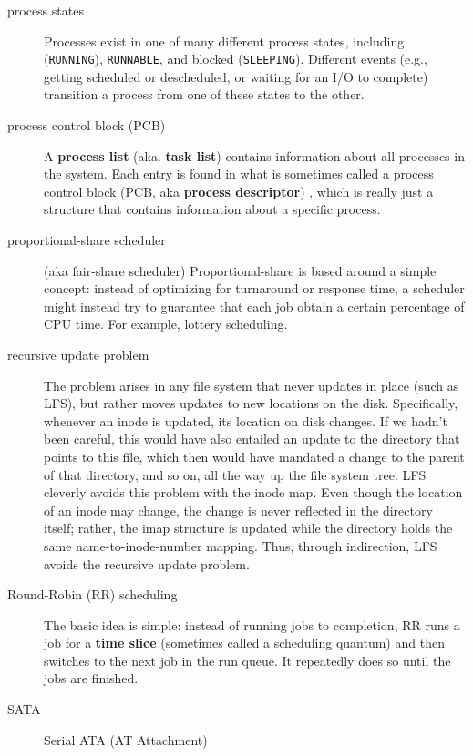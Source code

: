 \begin{description}
\item[process states] Processes exist in one of many different process states, including  (\texttt{RUNNING}),  \texttt{RUNNABLE}, and blocked (\texttt{SLEEPING}). Different events (e.g., getting scheduled or descheduled, or waiting for an I/O to complete) transition a process from one of these states to the other.

\item[process control block (PCB)] A \textbf{process list} (aka. \textbf{task list}) contains information about all processes in the system. Each entry is found in what is sometimes called a process control block (PCB, aka \textbf{process descriptor}) , which is really just a structure that contains information about a specific process.

\item[proportional-share scheduler] (aka fair-share scheduler) Proportional-share is based around a simple concept: instead of optimizing for turnaround or response time, a scheduler might instead try to guarantee that each job obtain a certain percentage of CPU time. For example, lottery scheduling.

\item[recursive update problem]  The problem arises in any file system that never updates in place (such as LFS), but rather moves updates to new locations on the disk. Specifically, whenever an inode is updated, its location on disk changes. If we hadn’t been careful, this would have also entailed an update to
the directory that points to this file, which then would have mandated
a change to the parent of that directory, and so on, all the way up the file
system tree. LFS cleverly avoids this problem with the inode map. Even though
the location of an inode may change, the change is never reflected in the
directory itself; rather, the imap structure is updated while the directory
holds the same name-to-inode-number mapping. Thus, through indirection, LFS avoids the recursive update problem.

\item[Round-Robin (RR) scheduling] The basic idea is simple: instead of running jobs to completion, RR runs a job for a \textbf{time slice} (sometimes called a scheduling quantum) and then switches to the next job in the run queue. It repeatedly does so until the jobs are finished. 

\item[SATA] Serial ATA (AT Attachment)


\end{description}
